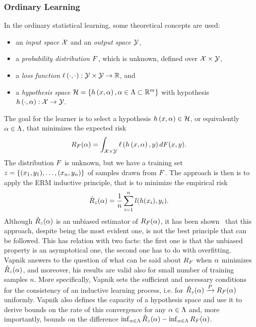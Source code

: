 \subsubsection*{Ordinary Learning}
In the ordinary statistical learning, some theoretical concepts are used:
\begin{itemize}
    \item an \emph{input space} $\mathcal{X}$ and an \emph{output space} $\mathcal{Y}$,
    \item a \emph{probability distribution} $F$, which is unknown, defined over $\mathcal{X} \times \mathcal{Y}$,
    \item a \emph{loss function} $\ell\left( \cdot, \cdot\right):\mathcal{Y} \times \mathcal{Y} \to \mathbb{R}$, and
    \item a \emph{hypothesis space} $\mathcal{H} = \left\{h\left(x, \alpha\right), \alpha \in \Lambda \subset \mathbb{R}^m\right\}$ with hypothesis $h\left(\cdot, \alpha\right): \mathcal{X} \to \mathcal{Y}$.
\end{itemize}
The goal for the learner is to select a hypothesis $h\left(x, \alpha\right) \in \mathcal{H}$, or equivalently $\alpha \in \Lambda$, that minimizes the expected risk
$$ R_F(\alpha) =  \int_{\mathcal{X} \times \mathcal{Y}} \ell\left( h\left(x, \alpha\right), y\right) dF(x, y) .$$
The distribution $F$ is unknown, but we have a training set $z = \{(x_1, y_1), \ldots, (x_n, y_n)\}$ of samples drawn from $F$. 
The approach is then is to apply the ERM inductive principle, that is to minimize the empirical risk
$$ \hat{R}_z(\alpha) = \frac{1}{n} \sum_{i=1}^n l(h(x_i), y_i).$$
Although $\hat{R}_z(\alpha)$ is an unbiased estimator of $R_F(\alpha)$, it has been shown~\cite{vapnik2013nature} that this approach, despite being the most evident one, is not the best principle that can be followed.
This has relation with two facts: the first one is that the unbiased property is an asymptotical one, the second one has to do with overfitting.
Vapnik answers to the question of what can be said about $R_F$ when $\alpha$ minimizes $\hat{R}_z(\alpha)$, and moreover, his results are valid also for small number of training samples $n$.
More specifically, Vapnik sets the sufficient and necessary conditions for the consistency of an inductive learning process, i.e. for $\hat{R}_z(\alpha) \xrightarrow{P} R_F(\alpha) $ uniformly. Vapnik also defines the capacity of a hypothesis space and use it to derive bounds on the rate of this convergence for any $\alpha \in \Lambda$ and, more importantly, bounds on the difference $\inf_{\alpha \in \Lambda} \hat{R}_z(\alpha) - \inf_{\alpha \in \Lambda} R_F(\alpha)$.
